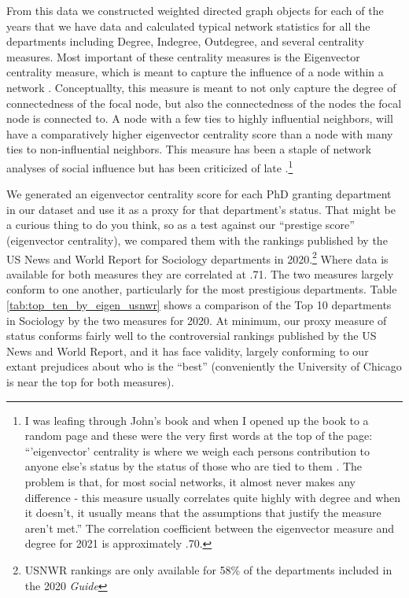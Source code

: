 \documentclass{article}
\begin{document}
From this data we constructed weighted directed graph objects for each of the years that we have data and calculated typical network statistics for all the departments including Degree, Indegree, Outdegree, and several centrality measures. Most important of these centrality measures is the Eigenvector centrality measure, which is meant to capture the influence of a node within a network \cite{bonacich_power_1987}. Conceptuallty, this measure is meant to not only capture the degree of connectedness of the focal node, but also the connectedness of the nodes the focal node is connected to. A node with a few ties to highly influential neighbors, will have a comparatively higher eigenvector centrality score than a node with many ties to non-influential neighbors. This measure has been a staple of network analyses of social influence but has been criticized of late \cite{martin_thinking_2018}.\footnote{I was leafing through John's book and when I opened up the book to a random page and these were the very first words at the top of the page: ``'eigenvector' centrality is where we weigh each persons contribution to anyone else's status by the status of those who are tied to them \cite{bonacich_power_1987}. The problem is that, for most social networks, it almost never makes any difference - this measure usually correlates quite highly with degree and when it doesn't, it usually means that the assumptions that justify the measure aren't met.'' The correlation coefficient between the eigenvector measure and degree for 2021 is approximately .70.}

We generated an eigenvector centrality score for each PhD granting department in our dataset and use it as a proxy for that department's status. That might be a curious thing to do you think, so as a test against our ``prestige score'' (eigenvector centrality), we compared them with the rankings published by the US News and World Report for Sociology departments in 2020.\footnote{USNWR rankings are only available for 58\% of the departments included in the 2020 \emph{Guide}} Where data is available for both measures they are correlated at .71. The two measures largely conform to one another, particularly for the most prestigious departments. Table \ref{tab:top_ten_by_eigen_usnwr} shows a comparison of the Top 10 departments in Sociology by the two measures for 2020. At minimum, our proxy measure of status conforms fairly well to the controversial rankings published by the US News and World Report, and it has face validity, largely conforming to our extant prejudices about who is the ``best'' (conveniently the University of Chicago is near the top for both measures).
\end{document}
